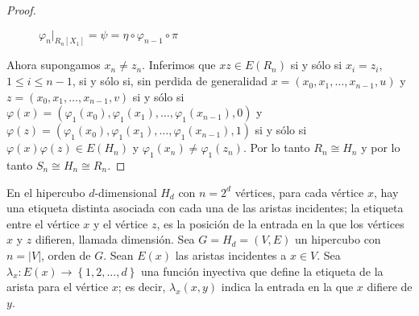 \begin{proof}
    \begin{figure}[H]
        \begin{center}
        \end{center} \caption{$\varphi_n \big|_{R_n [X_1]} = \psi = \eta \circ \varphi_{n-1} \circ \pi$} \label{diag}
    \end{figure}

    Ahora supongamos $x_n \ne z_n$. Inferimos que $xz \in E(R_n)$ si y s\'olo si $x_i = z_i$, $1 \le i \le {n-1}$, si
    y s\'olo si, sin perdida de generalidad $x=(x_0, x_1,\dots, x_{n-1}, u)$ y $z=(x_0, x_1,\dots, x_{n-1}, v)$ si y
    s\'olo si $\varphi(x)=(\varphi_1(x_0), \varphi_1(x_1),\dots, \varphi_1(x_{n-1}),0)$ y $\varphi(z)=(\varphi_1(x_0)
    , \varphi_1(x_1),\dots, \varphi_1(x_{n-1}),1)$ si y s\'olo si $\varphi(x)\varphi(z) \in E(H_n)$ y $\varphi_1(x_n)
    \ne \varphi_1(z_n)$. Por lo tanto $R_n \cong H_n$ y por lo tanto $S_n \cong H_n \cong R_n$.
\end{proof}

En el hipercubo $d$-dimensional $H_d$ con $n=2^d$ v\'ertices, para cada v\'ertice $x$, hay una etiqueta distinta
asociada con cada una de las aristas incidentes; la etiqueta entre el v\'ertice $x$ y el v\'ertice $z$, es la
posici\'on de la entrada en la que los v\'ertices $x$ y $z$ difieren, llamada dimensi\'on.
Sea $G=H_d=(V,E)$ un hipercubo con $n=|V|$, orden de $G$. Sean $E(x)$ las aristas incidentes a $x \in V$. Sea
$\lambda_x: E(x) \to \left\{1, 2, ..., d\right\}$ una funci\'on inyectiva que define la etiqueta de la arista para el
v\'ertice $x$; es decir, $\lambda_x(x,y)$ indica la entrada en la que $x$ difiere de $y$.


